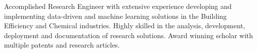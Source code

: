 

\begin{cvparagraph}

Accomplished Research Engineer with extensive experience developing and implementing data-driven and machine learning solutions in the Building Efficiency and Chemical industries. Highly skilled in the analysis, development, deployment and documentation of research solutions. Award winning scholar with multiple patents and research articles.

\end{cvparagraph}
